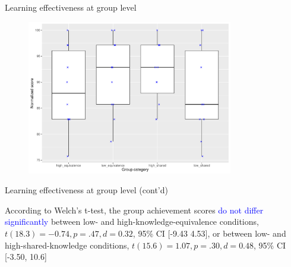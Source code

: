 \begin{frame}{Learning effectiveness at group level}
    
    \begin{figure}[tb]
     \begin{center}
      \includegraphics[width=90mm]{images/rqb_group-map-redraw.pdf}
      \end{center}
      \label{rqb::group-map}  
    \end{figure}
\end{frame}



\begin{frame}{Learning effectiveness at group level (cont'd)}

    {\small According to Welch's t-test, the group achievement scores \textcolor{blue}{do not differ significantly} between low- and high-knowledge-equivalence conditions, $t(18.3) = -0.74, p = .47, d = 0.32$, 95\% CI [-9.43  4.53], or between low- and high-shared-knowledge conditions, $t(15.6) = 1.07, p = .30, d = 0.48$, 95\% CI [-3.50, 10.6]}
\end{frame}


